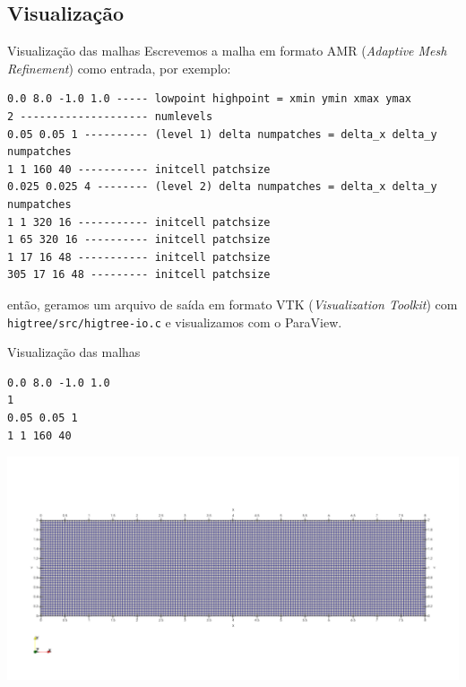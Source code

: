 \documentclass[../main/main.tex]{subfiles}
\begin{document}
\subsection{Visualização}
\begin{frame}[fragile]{Visualização das malhas}
    Escrevemos a malha em formato AMR (\textit{Adaptive Mesh Refinement}) como entrada, por exemplo:

    {\scriptsize
        \begin{verbatim}
0.0 8.0 -1.0 1.0 ----- lowpoint highpoint = xmin ymin xmax ymax
2 -------------------- numlevels
0.05 0.05 1 ---------- (level 1) delta numpatches = delta_x delta_y numpatches
1 1 160 40 ----------- initcell patchsize
0.025 0.025 4 -------- (level 2) delta numpatches = delta_x delta_y numpatches
1 1 320 16 ----------- initcell patchsize
1 65 320 16 ---------- initcell patchsize
1 17 16 48 ----------- initcell patchsize
305 17 16 48 --------- initcell patchsize
        \end{verbatim}
    }

    então, geramos um arquivo de saída em formato VTK (\textit{Visualization Toolkit}) com \texttt{higtree/src/higtree-io.c} e visualizamos com o ParaView.
\end{frame}

\begin{frame}[fragile]{Visualização das malhas}
    \begin{center}
        \begin{minipage}{0.30\textwidth}
            {\footnotesize
                \begin{verbatim}
0.0 8.0 -1.0 1.0
1
0.05 0.05 1
1 1 160 40
                \end{verbatim}
            }
        \end{minipage}
        \hfill
        \begin{minipage}{0.65\textwidth}
            \includegraphics[width=\textwidth]{imgs/ref1.png}
        \end{minipage}
    \end{center}
\end{frame}
\end{document}
